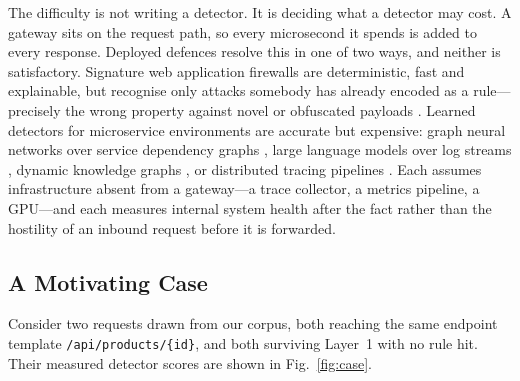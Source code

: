 \documentclass[conference]{IEEEtran}
\begin{document}
The difficulty is not writing a detector. It is deciding what a detector may cost. A gateway
sits on the request path, so every microsecond it spends is added to every response. Deployed
defences resolve this in one of two ways, and neither is satisfactory. Signature web
application firewalls are deterministic, fast and explainable, but recognise only attacks
somebody has already encoded as a rule---precisely the wrong property against novel or
obfuscated payloads \cite{levi2026mrg}. Learned detectors for microservice environments are
accurate but expensive: graph neural networks over service dependency graphs
\cite{liu2024lmgd}\cite{raeiszadeh2025artfl}, large language models over log streams
\cite{pedroso2025llm}, dynamic knowledge graphs \cite{moens2026kg}, or distributed tracing
pipelines \cite{liu2020traceanomaly}\cite{kohyarnejadfard2022nlp}. Each assumes infrastructure
absent from a gateway---a trace collector, a metrics pipeline, a GPU---and each measures
internal system health after the fact rather than the hostility of an inbound request before
it is forwarded.

\subsection{A Motivating Case}
\label{sec:case}
Consider two requests drawn from our corpus, both reaching the same endpoint template
\texttt{/api/products/\{id\}}, and both surviving Layer~1 with no rule hit. Their measured
detector scores are shown in Fig.~\ref{fig:case}.
\end{document}
